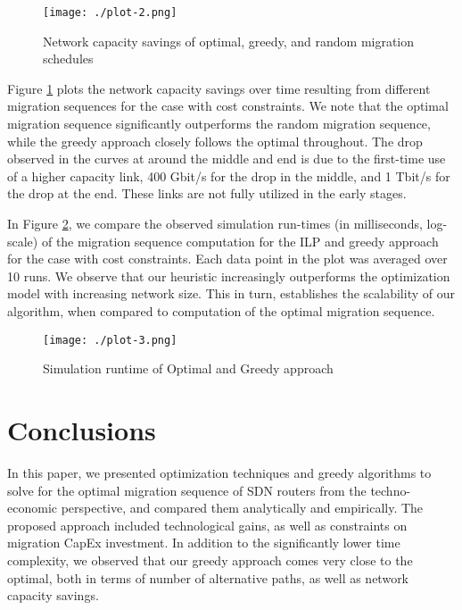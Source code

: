 \documentclass[conference]{IEEEtran}
\begin{document}
\begin{figure}
\begin{center}
\texttt{[image: ./plot-2.png]}
\caption{Network capacity savings of optimal, greedy, and random migration
schedules}
\label{fig:capacity savings}
\end{center}
\vspace{-5mm}
\end{figure}

\par Figure \ref{fig:capacity savings} plots the network capacity savings over
time resulting from different migration sequences for the case with cost
constraints. We note that the optimal migration sequence significantly
outperforms the random migration sequence, while the greedy approach closely
follows the optimal throughout. The drop observed in the curves at around
the middle and end is due to the first-time use of a higher capacity link, 400
Gbit/s for the drop in the middle, and 1 Tbit/s for the drop at the end. These
links are not fully utilized in the early stages.

\par In Figure \ref{fig:run-times}, we compare the observed simulation run-times
(in milliseconds, log-scale) of the migration sequence computation for the ILP
and greedy approach for the case with cost constraints.
Each data point in the plot was averaged over 10 runs.
We observe that our heuristic increasingly outperforms the optimization model
with increasing network size. This in turn, establishes the scalability of our
algorithm, when compared to computation of the optimal migration sequence.

\begin{figure}
\begin{center}
\texttt{[image: ./plot-3.png]}
\caption{Simulation runtime of Optimal and Greedy approach}
\label{fig:run-times}
\end{center}
\vspace{-5mm}
\end{figure}

\section{Conclusions}\label{sec:conclusion}

\par In this paper, we presented optimization techniques and greedy algorithms to solve for the optimal migration sequence of
SDN routers from the techno-economic perspective, and compared them analytically and empirically. The proposed approach included technological
gains, as well as constraints on migration CapEx investment.
In addition to the significantly lower time complexity, we observed that our
greedy approach comes very close to the optimal, both in terms of number of
alternative paths, as well as network capacity savings.



\end{document}

